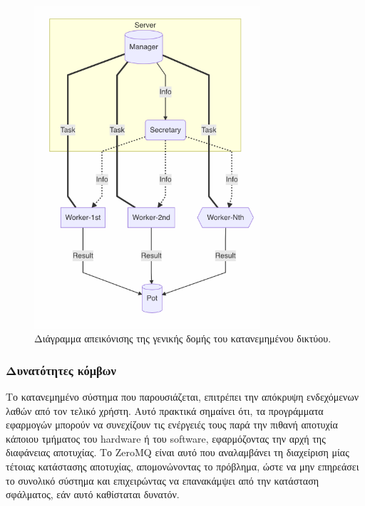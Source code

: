 \begin{figure}[!htbp]
\centering
\includegraphics[width=0.8\linewidth,height=12cm]{pictures/PipelineWorkflow.png}
\caption{Διάγραμμα απεικόνισης της γενικής δομής του κατανεμημένου δικτύου.}
\label{fig:workflow}       
\end{figure}

\subsubsection{Δυνατότητες κόμβων}

Το κατανεμημένο σύστημα που παρουσιάζεται, επιτρέπει την απόκρυψη ενδεχόμενων λαθών από τον τελικό χρήστη. Αυτό πρακτικά σημαίνει ότι, τα προγράμματα εφαρμογών μπορούν να συνεχίζουν τις ενέργειές τους παρά την πιθανή αποτυχία κάποιου τμήματος του hardware ή του software, εφαρμόζοντας την αρχή της διαφάνειας αποτυχίας. Το ZeroMQ είναι αυτό που αναλαμβάνει τη διαχείριση μίας τέτοιας κατάστασης αποτυχίας, απομονώνοντας το πρόβλημα, ώστε να μην επηρεάσει το συνολικό σύστημα και επιχειρώντας να επανακάμψει από την κατάσταση σφάλματος, εάν αυτό καθίσταται δυνατόν. 


